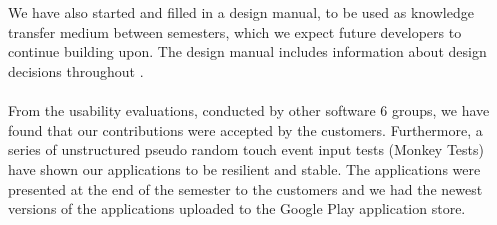 \\\\
We have also started and filled in a design manual, to be used as knowledge transfer medium between semesters, which we expect future \giraf developers to continue building upon. The design manual includes information about design decisions throughout \giraf.  
\\\\
From the usability evaluations, conducted by other software 6 groups, we have found that our contributions were accepted by the customers. Furthermore, a series of unstructured pseudo random touch event input tests (Monkey Tests) have shown our applications to be resilient and stable. The applications were presented at the end of the semester to the customers and we had the newest versions of the applications uploaded to the Google Play application store. 
